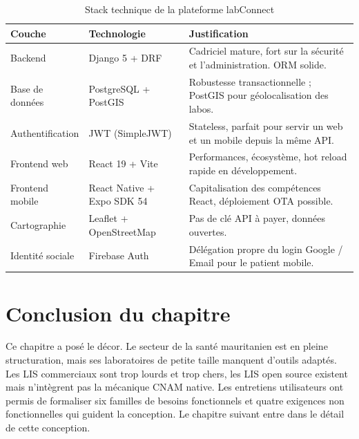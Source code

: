 \documentclass[12pt, a4paper, oneside]{report}
\begin{document}
\begin{table}[ht]
  \centering
  \caption{Stack technique de la plateforme labConnect}
  \label{tab:stack}
  \small
  \begin{tabularx}{\linewidth}{l l X}
    \toprule
    \textbf{Couche} & \textbf{Technologie} & \textbf{Justification} \\
    \midrule
    Backend        & Django 5 + DRF              & Cadriciel mature, fort sur la sécurité et l'administration. ORM solide. \\
    Base de données & PostgreSQL + PostGIS       & Robustesse transactionnelle ; PostGIS pour géolocalisation des labos. \\
    Authentification & JWT (SimpleJWT)           & Stateless, parfait pour servir un web et un mobile depuis la même API. \\
    Frontend web   & React 19 + Vite             & Performances, écosystème, hot reload rapide en développement. \\
    Frontend mobile & React Native + Expo SDK 54 & Capitalisation des compétences React, déploiement OTA possible. \\
    Cartographie   & Leaflet + OpenStreetMap     & Pas de clé API à payer, données ouvertes. \\
    Identité sociale & Firebase Auth             & Délégation propre du login Google / Email pour le patient mobile. \\
    \bottomrule
  \end{tabularx}
\end{table}

\section*{Conclusion du chapitre}
Ce chapitre a posé le décor. Le secteur de la santé mauritanien est en
pleine structuration, mais ses laboratoires de petite taille manquent
d'outils adaptés. Les LIS commerciaux sont trop lourds et trop chers,
les LIS open source existent mais n'intègrent pas la mécanique CNAM
native. Les entretiens utilisateurs ont permis de formaliser six
familles de besoins fonctionnels et quatre exigences non fonctionnelles
qui guident la conception. Le chapitre suivant entre dans le détail de
cette conception.

\newpage

\end{document}
